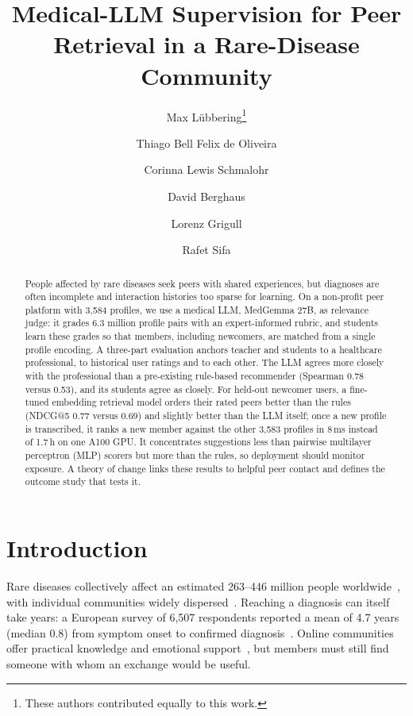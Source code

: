 \documentclass[runningheads,a4paper]{llncs}
\begin{document}
\title{Medical-LLM Supervision for Peer Retrieval in a Rare-Disease Community}
\author{Max Lübbering\fnmsep\thanks{These authors contributed equally to this work.}
    \and Thiago Bell Felix de Oliveira\fnmsep\protect\footnotemark[1]
    \and Corinna Lewis Schmalohr
    \and David Berghaus
    \and Lorenz Grigull
    \and Rafet Sifa
    }
\maketitle

\begin{abstract}
People affected by rare diseases seek peers with shared experiences, but
diagnoses are often incomplete and interaction histories too sparse for learning.
On a non-profit peer platform with 3,584 profiles, we use a medical LLM, MedGemma
27B, as relevance judge: it grades 6.3 million profile pairs with an
expert-informed rubric, and students learn these grades so that members,
including newcomers, are matched from a single profile encoding. A three-part
evaluation anchors teacher and students to a healthcare professional, to
historical user ratings and to each other. The LLM agrees more closely with the
professional than a pre-existing rule-based recommender (Spearman 0.78 versus 0.53), and its
students agree as closely. For held-out newcomer users, a fine-tuned embedding
retrieval model orders their rated peers better than the rules (NDCG@5 0.77 versus
0.69) and slightly better than the LLM itself; once a new profile is transcribed, it
ranks a new member against the other 3,583 profiles in 8\,ms instead of 1.7\,h on
one A100 GPU. It concentrates suggestions less than pairwise multilayer perceptron (MLP) scorers but more
than the rules, so deployment should monitor exposure. A theory of change links
these results to helpful peer contact and defines the outcome study that tests it.
\end{abstract}

\section{Introduction}\label{sec:intro}
Rare diseases collectively affect an estimated 263--446 million people
worldwide~\cite{nguengang2020estimating}, with individual communities
widely dispersed~\cite{titgemeyer2022facebook}.
Reaching a diagnosis can itself take years: a European survey of 6,507 respondents reported a mean of 4.7 years (median 0.8) from symptom onset to confirmed diagnosis~\cite{faye2024time}.
Online communities offer practical knowledge and emotional
support~\cite{doyle2024support}, but members must still find someone with
whom an exchange would be useful.
\end{document}
